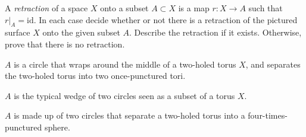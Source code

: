 A \emph{retraction} of a space $X$ onto a subset $A\subset X$ is a map
$r:X\rightarrow A$ such that $r|_A=\mathrm{id}$. In each case decide
whether or not there is a retraction of the pictured surface $X$ onto
the given subset $A$. Describe the retraction if it exists. Otherwise,
prove that there is no retraction. 
\begin{alist}
\item $A$ is a circle that wraps around the middle of a two-holed 
torus $X$, and separates the two-holed torus into two once-punctured
tori.
\item $A$ is the typical wedge of two circles seen as a subset of a
torus $X$.
\item $A$ is made up of two circles that separate a two-holed torus into
a four-times-punctured sphere.
\end{alist}

